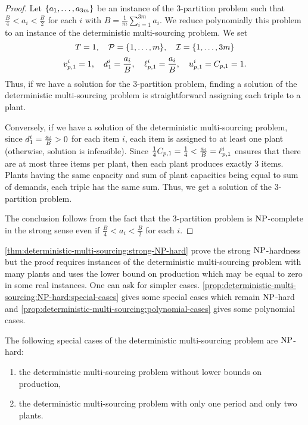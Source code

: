 \begin{proof}
Let $\crbracket{a_1,\ldots,a_{3m}}$ be an instance of the 3-partition problem such that $\frac{B}{4} < a_i < \frac{B}{2}$ for each $i$ with $B=\frac{1}{m}\sum_{i=1}^{3m}a_i$.
We reduce polynomially this problem to an instance of the deterministic multi-sourcing problem.
We set
$$
  \horizon=1
  ,\quad
  \plants=\range[1]{m}
  ,\quad
  \REF=\range[1]{3m}
$$
$$
  v_{p,1}^i=1
  ,\quad
  d_1^i=\frac{a_i}{B}
  ,\quad
  \ell_{p,1}^i=\frac{a_i}{B}
  ,\quad
  u_{p,1}^i=C_{p,1}=1.
$$
Thus, if we have a solution for the 3-partition problem, finding a solution of the deterministic multi-sourcing problem is straightforward assigning each triple to a plant.


Conversely, if we have a solution of the deterministic multi-sourcing problem, since $d_1^i=\frac{a_i}{B}>0$ for each item $i$, each item is assigned to at least one plant (otherwise, solution is infeasible).
Since $\frac{1}{4}C_{p,1}=\frac{1}{4} < \frac{a_i}{B} = \ell_{p,1}^i$ ensures that there are at most three items per plant, then each plant produces exactly 3 items.
Plants having the same capacity and sum of plant capacities being equal to sum of demands, each triple has the same sum.
Thus, we get a solution of the 3-partition problem.


The conclusion follows from the fact that the 3-partition problem is $\operatorname{NP}$-complete in the strong sense even if $\frac{B}{4} < a_i < \frac{B}{2}$ for each $i$.
\end{proof}


\cref{thm:deterministic-multi-sourcing:strong-NP-hard} prove the strong $\operatorname{NP}$-hardness but the proof requires instances of the deterministic multi-sourcing problem with many plants and uses the lower bound on production which may be equal to zero in some real instances.
One can ask for simpler cases.
\cref{prop:deterministic-multi-sourcing:NP-hard:special-cases} gives some special cases which remain $\operatorname{NP}$-hard and \cref{prop:deterministic-multi-sourcing:polynomial-cases} gives some polynomial cases.


\begin{prop}\label{prop:deterministic-multi-sourcing:NP-hard:special-cases}
  The following special cases of the deterministic multi-sourcing problem are $\operatorname{NP}$-hard:
  \begin{enumerate}
    \item\label{item:deterministic-multi-sourcing:NP-hard:without-production-lower-bound}
    the deterministic multi-sourcing problem without lower bounds on production,
    \item\label{item:deterministic-multi-sourcing:NP-hard:2-plants}
    the deterministic multi-sourcing problem with only one period and only two plants.
  \end{enumerate}
\end{prop}


